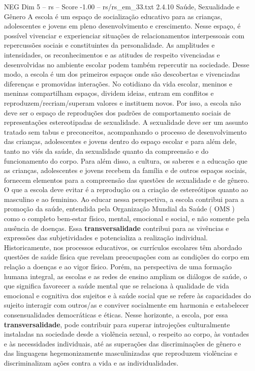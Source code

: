 \begin{textsample}{NEG Dim 5 – rs – Score -1.00 – rs/rs\_em\_33.txt}  \label{ex:f5_neg_026}
2.4.10 Saúde, Sexualidade e Gênero A escola é um espaço de socialização educativo para as crianças, adolescentes e jovens em pleno desenvolvimento e crescimento.
Nesse espaço, é possível vivenciar e experienciar situações de relacionamentos interpessoais com repercussões sociais e constituintes da personalidade.
As amplitudes e intensidades, os reconhecimentos e as atitudes de respeito vivenciadas e desenvolvidas no ambiente escolar podem também repercutir na sociedade.
Desse modo, a escola é um dos primeiros espaços onde são descobertas e vivenciadas diferenças e promovidas interações.
No cotidiano da vida escolar, meninos e meninas compartilham espaços, dividem ideias, entram em conflitos e reproduzem/recriam/superam valores e instituem novos.
Por isso, a escola não deve ser o espaço de reproduções dos padrões de comportamento sociais de representações estereotipadas de sexualidade.
A sexualidade deve ser um assunto tratado sem tabus e preconceitos, acompanhando o processo de desenvolvimento das crianças, adolescentes e jovens dentro do espaço escolar e para além dele, tanto no viés da saúde, da sexualidade quanto da compreensão e do funcionamento do corpo.
Para além disso, a cultura, os saberes e a educação que as crianças, adolescentes e jovens recebem da família e de outros espaços sociais, fornecem elementos para a compreensão das questões de sexualidade e de gênero.
O que a escola deve evitar é a reprodução ou a criação de estereótipos quanto ao masculino e ao feminino.
Ao educar nessa perspectiva, a escola contribui para a promoção da saúde, entendida pela Organização Mundial da Saúde ( OMS ) como o completo bem-estar físico, mental, emocional e social, e não somente pela ausência de doenças.
Essa \textbf{transversalidade} contribui para as vivências e expressões das subjetividades e potencializa a realização individual.
Historicamente, nos processos educativos, os currículos escolares têm abordado questões de saúde física que revelam preocupações com as condições do corpo em relação a doenças e ao vigor físico.
Porém, na perspectiva de uma formação humana integral, as escolas e as redes de ensino ampliam os diálogos de saúde, o que significa favorecer a saúde mental que se relaciona à qualidade de vida emocional e cognitiva dos sujeitos e à saúde social que se refere às capacidades do sujeito interagir com outros/as e conviver socialmente em harmonia e estabelecer consensualidades democráticas e éticas.
Nesse horizonte, a escola, por essa \textbf{transversalidade}, pode contribuir para superar introjeções culturalmente instaladas na sociedade desde a violência sexual, o respeito ao corpo, às vontades e às necessidades individuais, até as superações das discriminações de gênero e das linguagens hegemonizamente masculinizadas que reproduzem violências e discriminalizam ações contra a vida e as individualidades.

\end{textsample}
